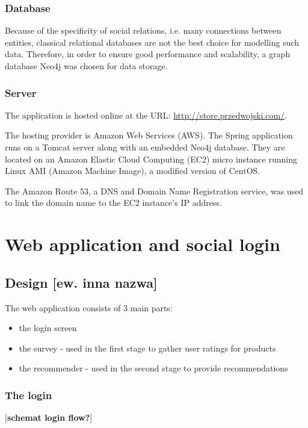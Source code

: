 \documentclass[12pt]{report}
\begin{document}
\subsubsection{Database}

Because of the specificity of social relations, i.e. many connections between entities, classical relational databases are not the best choice for modelling such data. Therefore, in order to ensure good performance and scalability, a graph database Neo4j \cite{neo4j} was chosen for data storage.

\subsubsection{Server}

The application is hosted online at the URL: \url{http://store.przedwojski.com/}. 

The hosting provider is Amazon Web Services (AWS). The Spring application runs on a Tomcat server along with an embedded Neo4j database. They are located on an Amazon Elastic Cloud Computing (EC2) micro instance running Linux AMI (Amazon Machine Image), a modified version of CentOS.

The Amazon Route 53, a DNS and Domain Name Registration service, was used to link the domain name to the EC2 instance's IP address.

\section{Web application and social login}
\subsection{Design [ew. inna nazwa]}

The web application consists of 3 main parts:
\begin{itemize}
\item the login screen
\item the survey - used in the first stage to gather user ratings for products
\item the recommender - used in the second stage to provide recommendations
\end{itemize}

\subsubsection{The login}
[{\bf schemat login flow?}]
\end{document}
